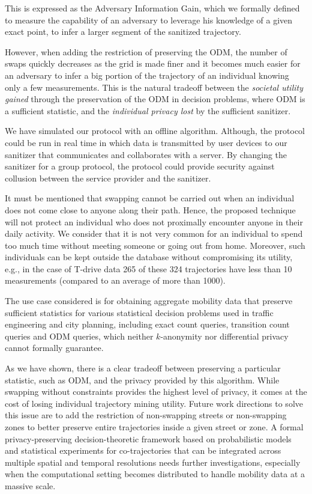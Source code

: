 This is expressed as the Adversary Information Gain, which we formally defined to measure the capability of an adversary to leverage his knowledge of a given exact point, to infer a larger segment of the sanitized trajectory.

However, when adding
the restriction of preserving the ODM, the number of swaps quickly
decreases as the grid is made finer and it becomes much easier for an
adversary to infer a big portion of the trajectory of an individual
knowing only a few measurements.  
This is the natural tradeoff between the {\em societal utility gained} through the preservation of the ODM in decision problems, where ODM is a sufficient statistic, and the {\em individual privacy lost} by the sufficient sanitizer.

We have simulated our protocol with an offline algorithm. Although, the protocol could be run in real time in which data is transmitted by user devices to our sanitizer that communicates and collaborates with a server. By changing the sanitizer for a group protocol, the protocol could provide security against collusion between the service provider and the sanitizer.


It must be mentioned that swapping cannot be carried out when an individual does not come close to anyone along their path. 
Hence, the proposed technique will not protect an individual who does not proximally encounter anyone in their daily activity.  
We consider that it is not very common for an individual to spend too much time without meeting someone or going out from home. Moreover, such individuals can be kept outside the database without compromising its utility, e.g., in the case of T-drive data 265 of these 324 trajectories have less than 10 measurements (compared to an average of more than 1000).


The use case considered is for obtaining aggregate mobility data that preserve sufficient statistics for various statistical decision problems used in traffic engineering and city planning, including exact count queries, transition count queries and ODM queries, which neither $k$-anonymity nor differential privacy cannot formally guarantee.

As we have shown, there is a clear tradeoff between preserving a particular statistic, such as ODM, and the privacy provided by this algorithm.
While swapping without constraints provides the highest level of privacy, it comes at the cost of losing individual trajectory mining utility.
Future work directions to solve this issue are to add the restriction of non-swapping streets or non-swapping zones to better preserve entire trajectories inside a given street or zone.  
A formal privacy-preserving decision-theoretic framework based on probabilistic models and statistical experiments for co-trajectories that can be integrated across multiple spatial and temporal resolutions needs further investigations, especially when the computational setting becomes distributed to handle mobility data at a massive scale.

